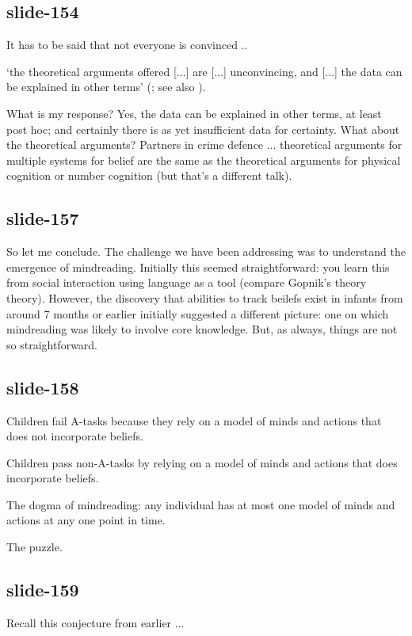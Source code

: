 \documentclass[12pt,\papersize]{extarticle}
\begin{document}
\subsection{slide-154}
It has to be said that not everyone is convinced ..

‘the theoretical arguments offered [...] are [...] unconvincing, and [...]
the data can be explained in other terms’
(\citealp{carruthers:2015_two}; see also \citealp{carruthers:2015_mindreading}).

What is my response?
Yes, the data can be explained in other terms, at least post hoc; and certainly
there is as yet insufficient data for certainty.
What about the theoretical arguments?
Partners in crime defence ... theoretical arguments
for multiple systems for belief are the same as the theoretical arguments
for physical cognition or number cognition (but that’s a different talk).

\subsection{slide-157}
So let me conclude.
The challenge we have been addressing was to understand the emergence of
mindreading.
Initially this seemed straightforward: you learn this from social
interaction using language as a tool (compare Gopnik's theory theory).
However, the discovery that abilities to track beilefs exist in infants
from around 7 months or earlier initially suggested a different picture:
one on which mindreading was likely to involve core knowledge. But, as
always, things are not so straightforward.

\subsection{slide-158}
Children fail A-tasks
because they rely on a model of minds and actions that does not incorporate beliefs.

Children pass non-A-tasks
by relying on a model of minds and actions that does incorporate beliefs.

The dogma of mindreading: any individual has at most one model of minds and actions
at any one point in time.

The puzzle.

\subsection{slide-159}
Recall this conjecture from earlier ...
\end{document}
